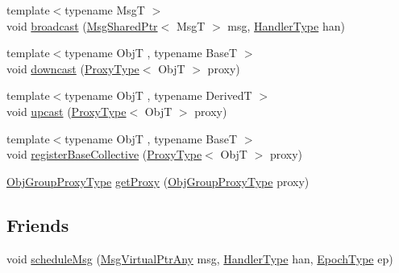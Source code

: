 \begin{DoxyCompactItemize}
\item 
{\footnotesize template$<$typename MsgT $>$ }\\void \hyperlink{structvt_1_1objgroup_1_1_obj_group_manager_a4bd17271d7a5d298ac74c73eedde4d8d}{broadcast} (\hyperlink{namespacevt_ab2b3d506ec8e8d1540aede826d84a239}{Msg\+Shared\+Ptr}$<$ MsgT $>$ msg, \hyperlink{namespacevt_af64846b57dfcaf104da3ef6967917573}{Handler\+Type} han)
\item 
{\footnotesize template$<$typename ObjT , typename BaseT $>$ }\\void \hyperlink{structvt_1_1objgroup_1_1_obj_group_manager_ab7ea99ad2668a99debd687a20bb9e3dd}{downcast} (\hyperlink{structvt_1_1objgroup_1_1_obj_group_manager_aea65eef52f240a52210132eef5ce591f}{Proxy\+Type}$<$ ObjT $>$ proxy)
\item 
{\footnotesize template$<$typename ObjT , typename DerivedT $>$ }\\void \hyperlink{structvt_1_1objgroup_1_1_obj_group_manager_abddd0f80c5b0f625a4ed487414c3b39b}{upcast} (\hyperlink{structvt_1_1objgroup_1_1_obj_group_manager_aea65eef52f240a52210132eef5ce591f}{Proxy\+Type}$<$ ObjT $>$ proxy)
\item 
{\footnotesize template$<$typename ObjT , typename BaseT $>$ }\\void \hyperlink{structvt_1_1objgroup_1_1_obj_group_manager_a6e869a6e38c7fe4e176814ca93ecf36e}{register\+Base\+Collective} (\hyperlink{structvt_1_1objgroup_1_1_obj_group_manager_aea65eef52f240a52210132eef5ce591f}{Proxy\+Type}$<$ ObjT $>$ proxy)
\item 
\hyperlink{namespacevt_ad7cae989df485fccca57f0792a880a8e}{Obj\+Group\+Proxy\+Type} \hyperlink{structvt_1_1objgroup_1_1_obj_group_manager_a9569c5ad1c032a90573bd987c64f560a}{get\+Proxy} (\hyperlink{namespacevt_ad7cae989df485fccca57f0792a880a8e}{Obj\+Group\+Proxy\+Type} proxy)
\end{DoxyCompactItemize}
\subsection*{Friends}
\begin{DoxyCompactItemize}
\item 
void \hyperlink{structvt_1_1objgroup_1_1_obj_group_manager_a151e47a8b9063752ff0a93f18e8c4a38}{schedule\+Msg} (\hyperlink{namespacevt_a54674b9f819f4f3a652c6f78d9b62aaf}{Msg\+Virtual\+Ptr\+Any} msg, \hyperlink{namespacevt_af64846b57dfcaf104da3ef6967917573}{Handler\+Type} han, \hyperlink{namespacevt_a985a5adf291c34a3ca263b3378388236}{Epoch\+Type} ep)
\end{DoxyCompactItemize}
